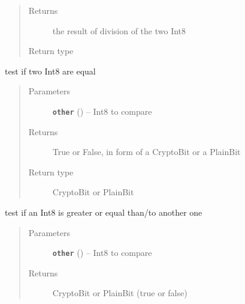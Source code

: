 \documentclass[letterpaper,10pt,english]{sphinxmanual}
\begin{document}
\begin{fulllineitems}
\begin{fulllineitems}
\begin{quote}
\begin{description}
\item[{Returns}] \leavevmode
the result of division of the two Int8

\item[{Return type}] \leavevmode
{\hyperref[datatypes.integers:datatypes.integers.Int8.Int8]{}}

\end{description}\end{quote}

\end{fulllineitems}


\begin{fulllineitems}
\label{datatypes.integers:datatypes.integers.Int8.Int8.__eq__}
test if two Int8 are equal
\begin{quote}\begin{description}
\item[{Parameters}] \leavevmode
\textbf{\texttt{other}} ({\hyperref[datatypes.integers:datatypes.integers.Int8.Int8]{}}) -- Int8 to compare

\item[{Returns}] \leavevmode
True or False, in form of a CryptoBit or a PlainBit

\item[{Return type}] \leavevmode
CryptoBit or PlainBit

\end{description}\end{quote}

\end{fulllineitems}


\begin{fulllineitems}
\label{datatypes.integers:datatypes.integers.Int8.Int8.__ge__}
test if an Int8 is greater or equal than/to another one
\begin{quote}\begin{description}
\item[{Parameters}] \leavevmode
\textbf{\texttt{other}} ({\hyperref[datatypes.integers:datatypes.integers.Int8.Int8]{}}) -- Int8 to compare

\item[{Returns}] \leavevmode
CryptoBit or PlainBit (true or false)


\end{description}
\end{quote}
\end{fulllineitems}
\end{fulllineitems}
\end{document}
